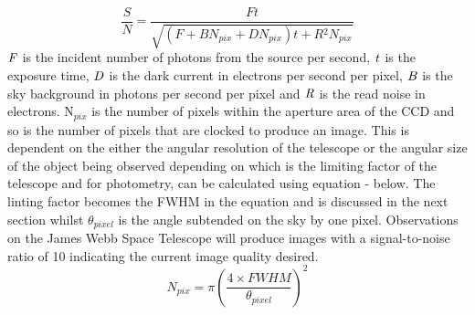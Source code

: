 \documentclass[pdf,color]{UoBnote}
\begin{document}
\begin{equation}
\frac{S}{N} = \frac{Ft}{\sqrt{(F + BN_{pix} + DN_{pix})t + R{^2}N_{pix}}}
\end{equation}
\newline
$\it{F}$ is the incident number of photons from the source per second, $\it{t}$ is the exposure time, $\it{D}$ is the dark current in electrons per second per pixel, $\it{B}$ is the sky background in photons per second per pixel and $\it{R}$ is the read noise in electrons. N$_{pix}$ is the number of pixels within the aperture area of the CCD and so is the number of pixels that are clocked to produce an image. This is dependent on the either the angular resolution of the telescope or the angular size of the object being observed depending on which is the limiting factor of the telescope and for photometry, can be calculated using equation - below. The linting factor becomes the FWHM in the equation and is discussed in the next section whilst $\theta$$_{pixel}$ is the angle subtended on the sky by one pixel. Observations on the James Webb Space Telescope will produce images with a signal-to-noise ratio of 10 indicating the current image quality desired. \\
\begin{equation}
N_{pix} = \pi (\frac{4 \times FWHM}{\theta_{pixel}})^2
\end{equation}
\end{document}
